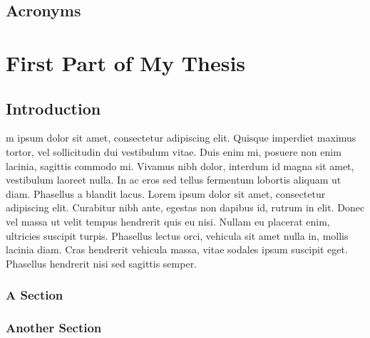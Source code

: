 \documentclass[]{thesis-phd-itt}
\begin{document}

\chapter*{Acronyms}
\begin{acronym}[UML]
\end{acronym}
\mainmatter %
\part{First Part of My Thesis}

\chapter{Introduction}
m ipsum dolor sit amet, consectetur adipiscing elit. Quisque imperdiet maximus tortor, vel sollicitudin dui vestibulum vitae. Duis enim mi, posuere non enim lacinia, sagittis commodo mi. Vivamus nibh dolor, interdum id magna sit amet, vestibulum laoreet nulla. In ac eros sed tellus fermentum lobortis aliquam ut diam. Phasellus a blandit lacus. Lorem ipsum dolor sit amet, consectetur adipiscing elit. Curabitur nibh ante, egestas non dapibus id, rutrum in elit. Donec vel massa ut velit tempus hendrerit quis eu nisi. Nullam eu placerat enim, ultricies suscipit turpis. Phasellus lectus orci, vehicula sit amet nulla in, mollis lacinia diam. Cras hendrerit vehicula massa, vitae sodales ipsum suscipit eget. Phasellus hendrerit nisi sed sagittis semper.

\section{A Section}
\lipsum[1-4] %

\section{Another Section}
\lipsum[1] %
\end{document}
